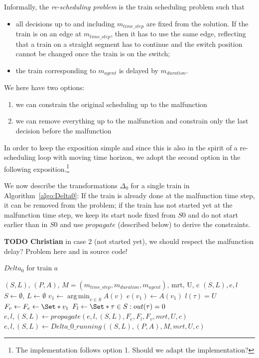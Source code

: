\documentclass{article}
\DeclareMathOperator*{\argmin}{arg\,min}
\begin{document}
Informally, the \emph{re-scheduling problem} is the train scheduling problem such that
\begin{itemize}
    \item all decisions up to and including $m_{time\_step}$ are fixed from the solution. If the train is on an edge at $m_{time\_step}$, then it has to use the same edge, reflecting that a train on a straight segment has to continue and the switch position cannot be changed once the train is on the switch;
    \item the train corresponding to $m_{agent}$ is delayed by $m_{duration}$.
\end{itemize}
We here have two options:
\begin{enumerate}
    \item we can constrain the original scheduling up to the malfunction
    \item we can remove everything up to the malfunction and constrain only the last decision before the malfunction
\end{enumerate}
In order to keep the exposition simple and since this is also in the spirit of a re-scheduling loop with moving time horizon, we adopt the second option in the following exposition.\footnote{The implementation follows option 1. Should we adapt the implementation?}



We now describe the transformations $\Delta_0$ for a single train in Algorithm~\ref{algo:Delta0}:
If the train is already done at the malfunction time step, it can be removed from the problem;
if the train has not started yet at the malfunction time step, we keep its start node fixed from $S0$ and do not start earlier than in $S0$ and use $propagate$ (described below) to derive the constraints.




\begin{mdframed}
{\bf TODO Christian} in case 2 (not started yet), we should respect the malfunction delay? Problem here and in source code!
\end{mdframed}




\begin{algorithm}
	\caption{$Delta_0$ for train $a$} \label{algo:Delta0}
	\begin{algorithmic}[1]
		\Require $(S,L)$, $(P,A)$, $M=(m_{time\_step},m_{duration},m_{agent})$, mrt, U, c
	    \Ensure $(S,L),e,l$
            \State $S\leftarrow \emptyset$, $L \leftarrow \emptyset$
            \State $v_1 \leftarrow \argmin_{v\in S} A(v)$
            \State $e(v_1) \leftarrow A(v_1)$
                \State $l(\tau)=U$
            \EndFor
            \State $F_v \leftarrow F_e \leftarrow \Set*{v_1}$
            \State $F_l \leftarrow \Set*{\tau \in S: out(\tau)=0}$
            \State $e,l,(S,L) \leftarrow propagate(e,l,(S,L),F_e,F_l,F_v, mrt, U, c)$
        \Else
            \State $e,l,(S,L) \leftarrow Delta\_0\_running((S,L), (P,A), M, mrt, U, c)$
        \EndIf
\end{algorithmic}
\end{algorithm}
\end{document}
